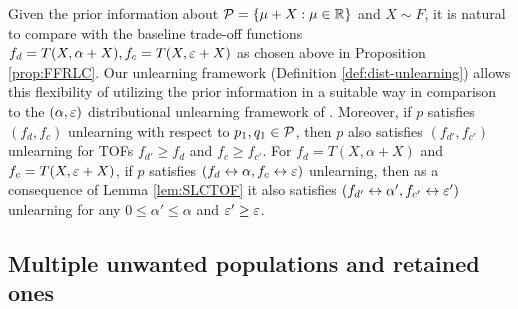 \begin{remark}
    Given the prior information about $\mathcal{P}=\{\mu+X: \mu \in \mathbb{R}\}$ and $X\sim F$, it is  natural to compare with the baseline trade-off functions $f_d=T(X,\alpha+X),f_c=T(X, \varepsilon+ X)$ as chosen above in Proposition \ref{prop:FFRLC}. Our unlearning framework (Definition \ref{def:dist-unlearning}) allows this flexibility of utilizing the prior information in a suitable way in comparison to the $(\alpha, \varepsilon)$ distributional unlearning framework of \cite{allouah2025distributionalmachineunlearningselective}. Moreover, if $p$ satisfies $(f_d,f_c)$ unlearning with respect to $p_1,q_1\in \mathcal{P}$, then $p$ also satisfies $(f_{d'},f_{c'})$ unlearning for TOFs $f_{d'} \geq f_d$ and $f_c \geq f_{c'}$. For $f_d=T(X, \alpha +X)$ and  $f_c=T(X, \varepsilon+X)$, if $p$ satisfies $(f_d \leftrightarrow \alpha ,f_c \leftrightarrow \varepsilon)$ unlearning, then as a consequence of Lemma \ref{lem:SLCTOF} it also satisfies  $(f_{d'} \leftrightarrow \alpha' ,f_{c'} \leftrightarrow \varepsilon')$ unlearning for any $0\leq \alpha' \leq \alpha$ and $\varepsilon' \geq \varepsilon$.
\end{remark}
\subsection{Multiple unwanted populations and retained ones} \label{ssec:multiple}


